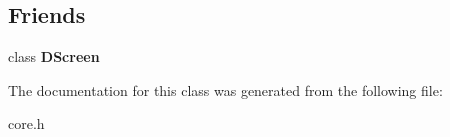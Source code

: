 \subsection*{Friends}
\begin{DoxyCompactItemize}
\item 
\mbox{\label{class_mywebcam_1_1_t_a_s_k_aad43f5e9d5fed3bde57927cae090a983}} 
class {\bfseries D\+Screen}
\end{DoxyCompactItemize}


The documentation for this class was generated from the following file\+:\begin{DoxyCompactItemize}
\item 
core.\+h\end{DoxyCompactItemize}
